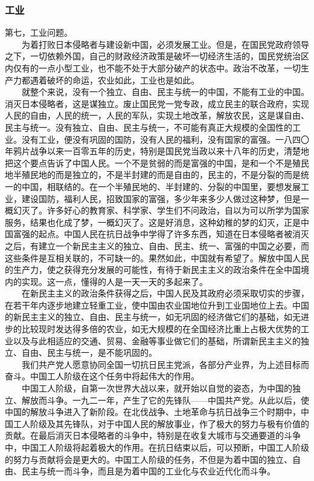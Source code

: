 \documentclass[cn,11pt,chinese]{elegantbook}
\def\myformat#1{\hfil\hfil #1}
\begin{document}
\subsubsection*{\myformat{工业}}
第七，工业问题。\\
　　为着打败日本侵略者与建设新中国，必须发展工业。但是，在国民党政府领导之下，一切依赖外国，自己的财政经济政策是破坏一切经济生活的，国民党统治区内仅有的一点小型工业，也不能不处于大部分破产的状态中。政治不改革，一切生产力都遇着破坏的命运，农业如此，工业也是如此。\\
　　就整个来说，没有一个独立、自由、民主与统一的中国，不能有工业的中国。消灭日本侵略者，这是谋独立。废止国民党一党专政，成立民主的联合政府，实现人民的自由，人民的统一，人民的军队，实现土地改革，解放农民，这是谋自由、民主与统一。没有独立、自由、民主与统一，不可能有真正大规模的全国性的工业。没有工业，便没有巩固的国防，没有人民的福利，没有国家的富强。一八四〇年鸦片战争以来一百零五年的历史，特别是国民党当政以来十八年的历史，清楚地把这个要点告诉了中国人民。一个不是贫弱的而是富强的中国，是和一个不是殖民地半殖民地的而是独立的，不是半封建的而是自由的，民主的，不是分裂的而是统一的中国，相联结的。在一个半殖民地的、半封建的、分裂的中国里，要想发展工业，建设国防，福利人民，招致国家的富强，多少年来多少人做过这种梦，但是一概幻灭了。许多好心的教育家、科学家、学生们不问政治，自以为可以所学为国家服务，结果也化成了梦，一概幻灭了。这是好消息，这种幼稚的梦的幻灭，正是中国富强的起点。中国人民在抗日战争中学得了许多东西，知道在日本侵略者被消灭之后，有建立一个新民主主义的独立、自由、民主、统一、富强的中国之必要，而这些条件是互相关联的，不可缺一的。果然如此，中国就有希望了。解放中国人民的生产力，使之获得充分发展的可能性，有待于新民主主义的政治条件在全中国境内的实现。这一点，懂得的人是一天一天的多起来了。\\
　　在新民主主义的政治条件获得之后，中国人民及其政府必须采取切实的步骤，在若干年内逐步地建立轻重工业，使中国由农业国地位升到工业国地位上去。中国的新民主主义的独立、自由、民主与统一，如无巩固的经济做它们的基础，如无进步的比较现时发达得多倍的农业，如无大规模的在全国经济比重上占极大优势的工业以及与此相适应的交通、贸易、金融等事业做它们的基础，所谓新民主主义的独立、自由、民主与统一，是不能巩固的。\\
　　我们共产党人愿意协同全国一切抗日民主党派，各部分产业界，为上述目标而奋斗。中国工人阶级在这个任务中将起伟大的作用。\\
　　中国工人阶级，自第一次世界大战以来，就开始以自觉的姿态，为中国的独立、解放而斗争。一九二一年，产生了它的先锋队——中国共产党。从此以后，使中国的解放斗争进入了新阶段。在北伐战争、土地革命与抗日战争三个时期中，中国工人阶级及其先锋队，对于中国人民的解放事业，作了极大的努力与极有价值的贡献。在最后消灭日本侵略者的斗争中，特别是在收复大城市与交通要道的斗争中，中国工人阶级将起着极大的作用。在抗日结束以后，可以预断，中国工人阶级的努力与贡献将会是更大的。中国工人阶级的任务，不但是为着中国的独立、自由、民主与统一而斗争，而且是为着中国的工业化与农业近代化而斗争。\\
\end{document}

